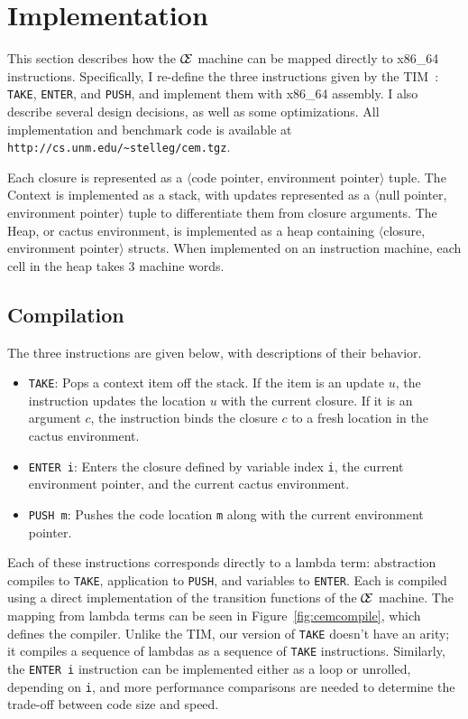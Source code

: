 \section{Implementation} \label{sec:impl}

This section describes how the $\mathcal{\mathcal{C} \mskip -4mu \mathcal{E}}$
machine can be mapped directly to x86\_64 instructions. Specifically, I re-define
the three instructions given by the TIM~\cite{TIM}: \texttt{TAKE},
\texttt{ENTER}, and \texttt{PUSH}, and implement them with x86\_64 assembly. I 
also describe several design decisions, as well as some optimizations. All
implementation and benchmark code is available at
\texttt{http://cs.unm.edu/\textasciitilde stelleg/cem.tgz}.

Each closure is represented as a $\langle$code pointer, environment
pointer$\rangle$ tuple. The
Context is implemented as a stack, with updates represented as a $\langle$null pointer,
environment pointer$\rangle$ tuple to differentiate them from closure arguments. The
Heap, or cactus environment, is implemented as a heap containing $\langle$closure,
environment pointer$\rangle$ structs. When implemented on an instruction
machine, each cell in the heap takes 3 machine words.

\subsection{Compilation}
The three instructions are given below, with descriptions of their behavior. 

\begin{itemize}
\item \texttt{TAKE}: Pops a context item off the stack. If the item is an
update $u$, the instruction updates the location $u$ with the current closure.
If it is an argument $c$, the instruction binds the closure $c$ to a fresh
location in the cactus environment.
\item \texttt{ENTER i}: Enters the closure defined by variable index \texttt{i},
the current environment pointer, and the current cactus environment.  \item
\texttt{PUSH m}: Pushes the code location \texttt{m} along with the
current environment pointer. 
\end{itemize}

Each of these instructions corresponds directly to a lambda term: abstraction
compiles to \texttt{TAKE}, application to \texttt{PUSH}, and variables to
\texttt{ENTER}. Each is compiled using a direct implementation of the transition
functions of the $\mathcal{\mathcal{C} \mskip -4mu \mathcal{E}}$ machine. The
mapping from lambda terms can be seen in Figure~\ref{fig:cemcompile}, which
defines the compiler. Unlike the TIM, our version of \texttt{TAKE} doesn't have
an arity; it compiles a sequence of lambdas as a sequence of \texttt{TAKE}
instructions. Similarly, the \texttt{ENTER i} instruction can be implemented
either as a loop or unrolled, depending on \texttt{i}, and more performance
comparisons are needed to determine the trade-off between code size and speed.

